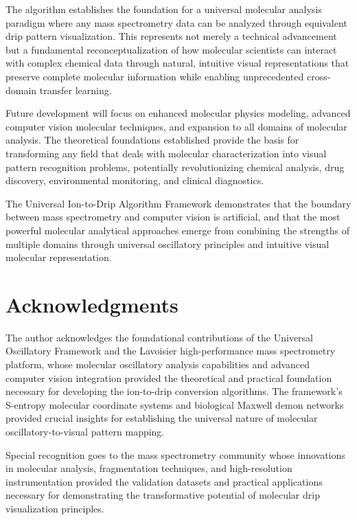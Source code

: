 \documentclass[12pt,a4paper]{article}
\begin{document}
The algorithm establishes the foundation for a universal molecular analysis paradigm where any mass spectrometry data can be analyzed through equivalent drip pattern visualization. This represents not merely a technical advancement but a fundamental reconceptualization of how molecular scientists can interact with complex chemical data through natural, intuitive visual representations that preserve complete molecular information while enabling unprecedented cross-domain transfer learning.

Future development will focus on enhanced molecular physics modeling, advanced computer vision molecular techniques, and expansion to all domains of molecular analysis. The theoretical foundations established provide the basis for transforming any field that deals with molecular characterization into visual pattern recognition problems, potentially revolutionizing chemical analysis, drug discovery, environmental monitoring, and clinical diagnostics.

The Universal Ion-to-Drip Algorithm Framework demonstrates that the boundary between mass spectrometry and computer vision is artificial, and that the most powerful molecular analytical approaches emerge from combining the strengths of multiple domains through universal oscillatory principles and intuitive visual molecular representation.

\section{Acknowledgments}

The author acknowledges the foundational contributions of the Universal Oscillatory Framework and the Lavoisier high-performance mass spectrometry platform, whose molecular oscillatory analysis capabilities and advanced computer vision integration provided the theoretical and practical foundation necessary for developing the ion-to-drip conversion algorithms. The framework's S-entropy molecular coordinate systems and biological Maxwell demon networks provided crucial insights for establishing the universal nature of molecular oscillatory-to-visual pattern mapping.

Special recognition goes to the mass spectrometry community whose innovations in molecular analysis, fragmentation techniques, and high-resolution instrumentation provided the validation datasets and practical applications necessary for demonstrating the transformative potential of molecular drip visualization principles.
\end{document}
